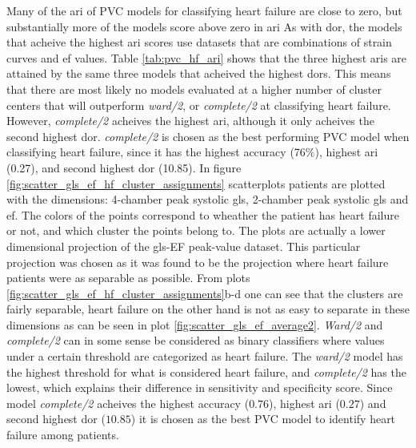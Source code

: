 Many of the \acrshort{ari} of PVC models for classifying heart failure are close to zero, but substantially more of the models score above zero in \acrshort{ari}
As with \acrshort{dor}, the models that acheive the highest \acrshort{ari} scores use datasets that are combinations of strain curves and \acrshort{ef} values.
Table \ref{tab:pvc_hf_ari} shows that the three highest \acrshort{ari}s are attained by the same three models that acheived the highest \acrshort{dor}s. 
This means that there are most likely no models evaluated at a higher number of cluster centers that will outperform \textit{ward/2}, or \textit{complete/2} at classifying heart failure. 
However, \textit{complete/2} acheives the highest \acrshort{ari}, although it only acheives the second highest \acrshort{dor}.
\textit{complete/2} is chosen as the best performing PVC model when classifying heart failure, 
since it has the highest accuracy (76$\%$), highest \acrshort{ari} (0.27), and second highest \acrshort{dor} (10.85). 
In figure \ref{fig:scatter_gls_ef_hf_cluster_assignments} scatterplots patients are plotted with the dimensions: 4-chamber peak systolic \acrshort{gls}, 2-chamber peak systolic \acrshort{gls} and \acrshort{ef}. 
The colors of the points correspond to wheather the patient has heart failure or not, and which cluster the points belong to.
The plots are actually a lower dimensional projection of the \acrshort{gls}-EF peak-value dataset. 
This particular projection was chosen as it was found to be the projection where heart failure patients were as separable as possible. 
From plots \ref{fig:scatter_gls_ef_hf_cluster_assignments}b-d one can see that the clusters are fairly separable, 
heart failure on the other hand is not as easy to separate in these dimensions as can be seen in plot \ref{fig:scatter_gls_ef_average2}. 
\textit{Ward/2} and \textit{complete/2} can in some sense be considered as binary classifiers where values under a certain threshold are categorized as heart failure.
The \textit{ward/2} model has the highest threshold for what is considered heart failure, and \textit{complete/2} has the lowest, 
which explains their difference in sensitivity and specificity score. 
Since model \textit{complete/2} acheives the highest accuracy ($0.76$), highest \acrshort{ari} ($0.27$) and second highest \acrshort{dor} ($10.85$) it is chosen as the best PVC model to identify heart failure among patients.
\bigskip

